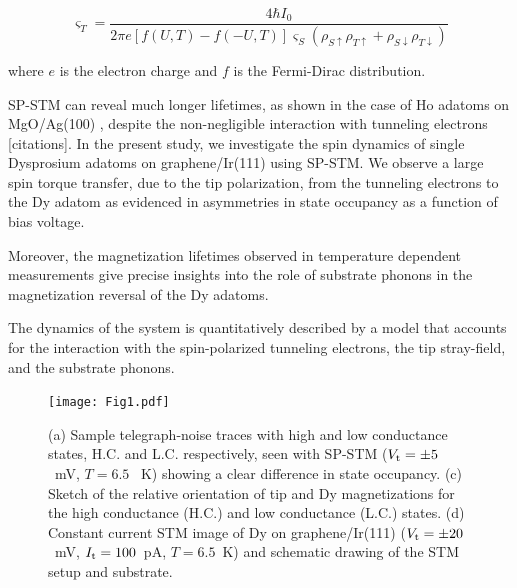 \documentclass[
reprint,amsmath,amssymb,aps]{revtex4-2}
\begin{document}
\begin{equation}
   \varsigma_T= \dfrac{4 \hbar I_0}{2\pi e [f(U,T)-f(-U,T)]\varsigma_S (\rho_{S\uparrow} \rho_{T\uparrow} + \rho_{S\downarrow} \rho_{T\downarrow})}
\end{equation}

where $e$ is the electron charge and $f$ is the Fermi-Dirac distribution.

SP-STM can reveal much longer lifetimes, as shown in the case of Ho adatoms on MgO/Ag(100) \citep{Natterer2017,Natterer2018,Forrester2019}, despite the non-negligible interaction with tunneling electrons [citations].
In the present study, we investigate the spin dynamics of single Dysprosium adatoms on graphene/Ir(111) using SP-STM. We observe a large spin torque transfer, due to the tip polarization, from the tunneling electrons to the Dy adatom as evidenced in asymmetries in state occupancy as a function of bias voltage. \par

Moreover, the magnetization lifetimes observed in temperature dependent measurements give precise insights into the role of substrate phonons in the magnetization reversal of the Dy adatoms.

The dynamics of the system is quantitatively described by a model that accounts for the interaction with the spin-polarized tunneling electrons, the tip stray-field, and the substrate phonons.
\begin{figure}[pt!]
\texttt{[image: Fig1.pdf]}
\caption{\label{fig:wide} (a) Sample telegraph-noise traces with high and low conductance states, H.C. and L.C. respectively, seen with SP-STM ($V_{\rm t} = \pm 5$ ~mV, $T = 6.5$ ~K) showing a clear difference in state occupancy. (c) Sketch of the relative orientation of tip and Dy magnetizations for the high conductance (H.C.) and low conductance (L.C.) states. (d) Constant current STM image of Dy on graphene/Ir(111) ($V_{\rm t} = \pm 20$~mV, $I_{\rm t} = 100 $~pA, $T = 6.5 $~K) and schematic drawing of the STM setup and substrate.}
\end{figure}
\end{document}
